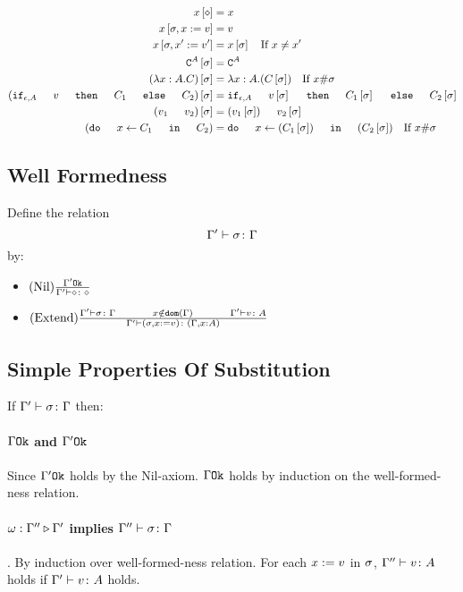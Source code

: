 {        
        \begin{align}
            x\sub{\nil} & = x \\
            x\sub{\si,x\setto v} & = v \\
            x\sub{\si,x'\setto v'} & = x\ssi\qt{If }x \neq x'\\
            \const{A}\ssi & = \const{A} \\
            (\lam{x}{A}{C})\ssi &= \lam{x}{A}{(C\ssi)}\qt{If }x\#\si\\
            (\ifthenelse{\e}{A}{v}{C_1}{C_2})\ssi &= \ifthenelse{\e}{A}{v\ssi}{C_1\ssi}{C_2\ssi}\\
            (\apply{v_1}{v_2})\ssi&= \apply{(v_1\ssi)}{v_2\ssi}\\
            (\doin{x}{C_1}{C_2})&= \doin{x}{(C_1\ssi)}{(C_2\ssi)}\qt{If } x\#\si\\
        \end{align}
    \subsection{Well Formedness}
    Define the relation $$\Gamma' \vdash \sigma \colon \Gamma$$ by:

    \begin{itemize}
        \item $(\text{Nil}) \frac{\Gamma' \texttt{Ok}}{\Gamma' \vdash \diamond \colon \diamond}$
        \item $\treerule{Extend}{
            \typerelation{\G'}{\si}{\G}
            \s\s
            x\notin\dom{\G}
            \s\s
            \typerelation{\G'}{v}{A}
        }{
            \typerelation{\G'}{(\si, x \setto v)}{(\gax)}
        }$
    \end{itemize}
    \subsection{Simple Properties Of Substitution}
    If $\Gamma' \vdash \sigma \colon \Gamma$ then:
    
        \paragraph{$\Gamma \texttt{Ok}$ and $\Gamma' \texttt{Ok}$}
         Since $\Gamma' \texttt{Ok}$ holds by the Nil-axiom. $\Gamma \texttt{Ok}$ holds by induction on the well-formed-ness relation.
        \paragraph{$\omega : \Gamma'' \triangleright \Gamma'$ implies $\Gamma'' \vdash \sigma \colon \Gamma$}. 
        By induction over well-formed-ness relation. For each $x:= v$ in $\sigma$, $\Gamma'' \vdash v \colon A$ holds if $\Gamma' \vdash v \colon A$ holds.
}
